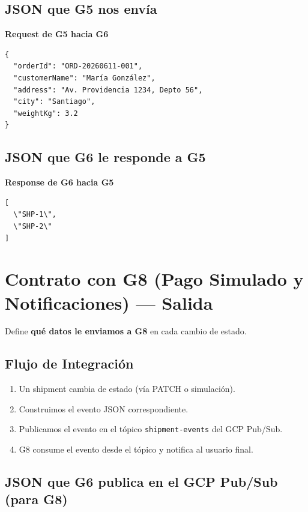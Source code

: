 \documentclass[11pt, a4paper]{article}
\newcommand{\contractheader}[1]{%
  \noindent\colorbox{primary!10}{%
    \parbox{\dimexpr\textwidth-2\fboxsep}{%
      \textbf{\faFileCode\quad #1}%
    }%
  }
  \vspace{0.3cm}
}
\begin{document}
\subsection{JSON que G5 nos envía}

\contractheader{Request de G5 hacia G6}

\begin{lstlisting}
{
  "orderId": "ORD-20260611-001",
  "customerName": "María González",
  "address": "Av. Providencia 1234, Depto 56",
  "city": "Santiago",
  "weightKg": 3.2
}
\end{lstlisting}

\subsection{JSON que G6 le responde a G5}

\contractheader{Response de G6 hacia G5}

\begin{lstlisting}
[
  \"SHP-1\",
  \"SHP-2\"
]
\end{lstlisting}




\section{Contrato con G8 (Pago Simulado y Notificaciones) --- Salida}
\label{sec:contrato-g8}

Define \textbf{qué datos le enviamos a G8} en cada cambio de estado.

\subsection{Flujo de Integración}

\begin{enumerate}[noitemsep]
  \item Un shipment cambia de estado (vía PATCH o simulación).
  \item Construimos el evento JSON correspondiente.
  \item Publicamos el evento en el tópico \texttt{shipment-events} del GCP Pub/Sub.
  \item G8 consume el evento desde el tópico y notifica al usuario final.
\end{enumerate}

\subsection{JSON que G6 publica en el GCP Pub/Sub (para G8)}
\end{document}
